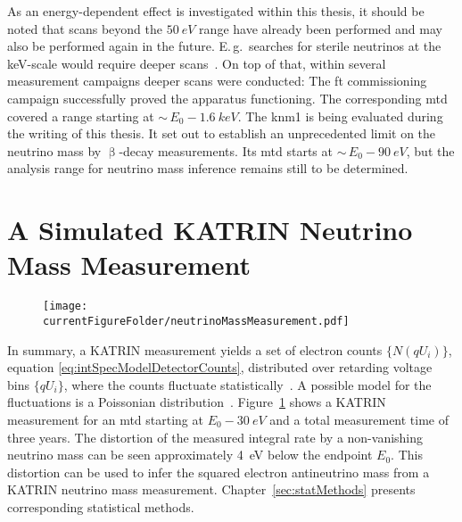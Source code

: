 As an energy-dependent effect is investigated within this thesis, it should be noted that scans beyond the $\SI{50}{eV}$ range have already been performed and may also be performed again in the future. E.\,g.~searches for sterile neutrinos at the keV-scale would require deeper scans~\cite{Mertens2019}. On top of that, within several measurement campaigns deeper scans were conducted: The \gls{ft} commissioning campaign successfully proved the apparatus functioning. The corresponding \gls{mtd} covered a range starting at $\sim\,E_0-\SI{1.6}{keV}$. The \gls{knm1} is being evaluated during the writing of this thesis. It set out to establish an unprecedented limit on the neutrino mass by $\upbeta$-decay measurements. Its \gls{mtd} starts at $\sim\,E_0-\SI{90}{eV}$, but the analysis range for neutrino mass inference remains still to be determined.

\section{A Simulated KATRIN Neutrino Mass Measurement}
\label{sec:intSpecModelNuMassMeasurement}
\begin{figure}
	\centering
	\texttt{[image: \\currentFigureFolder/neutrinoMassMeasurement.pdf]}
	\label{fig:katrinExpNuMassMeasurement}
\end{figure}
In summary, a KATRIN measurement yields a set of electron counts $\{N(qU_i)\}$, equation \eqref{eq:intSpecModelDetectorCounts}, distributed over retarding voltage bins $\{qU_i\}$, where the counts fluctuate statistically~\cite{Angrik:2005ep}. A possible model for the fluctuations is a Poissonian distribution~\cite{Kleesiek2014}. Figure~\ref{fig:katrinExpNuMassMeasurement} shows a KATRIN measurement for an \gls{mtd} starting at $E_0-\SI{30}{eV}$ and a total measurement time of three years. The distortion of the measured integral rate by a non-vanishing neutrino mass can be seen approximately \SI{4}{eV} below the endpoint $E_0$. This distortion can be used to infer the squared electron antineutrino mass from a KATRIN neutrino mass measurement. Chapter~\ref{sec:statMethods} presents corresponding statistical methods.